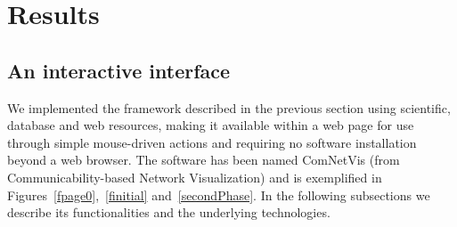 \documentclass[Afour,sagev,times]{sagej}
\begin{document}
\section{Results}
\subsection{An interactive interface}\label{sint}
We implemented the framework described in the previous section using scientific,
database and web resources, making it available within a web page
for use through simple mouse-driven actions and requiring no software installation beyond a web browser. %
The software has been named ComNetVis (from Communicability-based Network Visualization)
and is exemplified in Figures~\ref{fpage0},~\ref{finitial} and~\ref{secondPhase}.
In the following subsections we describe its functionalities and the underlying technologies.
\end{document}

